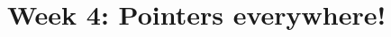 \documentclass[11pt,a4paper]{book}
\begin{document}
\chapter{Week 4: Pointers everywhere!}

%

\end{document}
